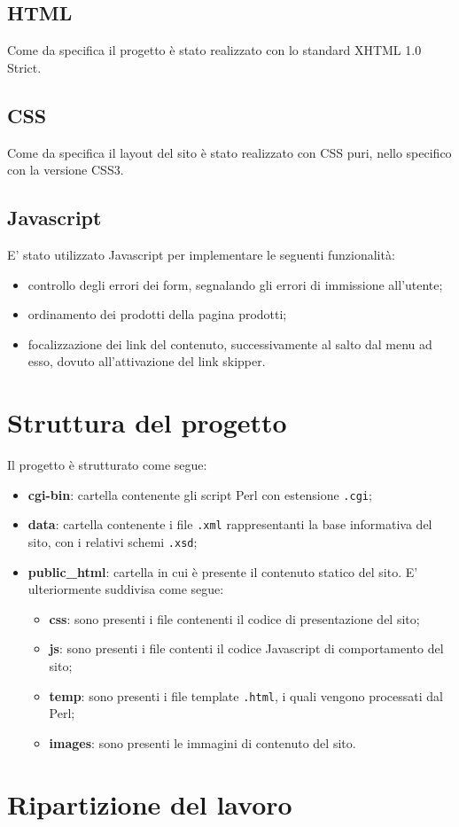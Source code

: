 	\subsection{HTML}
	Come da specifica il progetto è stato realizzato con lo standard XHTML 1.0 Strict.
	\subsection{CSS}
	Come da specifica il layout del sito è stato realizzato con CSS puri, nello specifico con la versione CSS3.
	\subsection{Javascript}
	E' stato utilizzato Javascript per implementare le seguenti funzionalità:
	\begin{itemize}
		\item controllo degli errori dei form, segnalando gli errori di immissione all'utente;
		\item ordinamento dei prodotti della pagina prodotti;
		\item focalizzazione dei link del contenuto, successivamente al salto dal menu ad esso, dovuto all'attivazione del link skipper.
	\end{itemize}
\section{Struttura del progetto}
	Il progetto è strutturato come segue:
	\begin{itemize}
		\item \textbf{cgi-bin}: cartella contenente gli script Perl con estensione \texttt{.cgi};
		\item \textbf{data}: cartella contenente i file \texttt{.xml} rappresentanti la base informativa del sito, con i relativi schemi \texttt{.xsd};
		\item \textbf{public\_html}: cartella in cui è presente il contenuto statico del sito. E' ulteriormente suddivisa come segue:
		\begin{itemize}
			\item \textbf{css}: sono presenti i file contenenti il codice di presentazione del sito;
			\item \textbf{js}: sono presenti i file contenti il codice Javascript di comportamento del sito;
			\item \textbf{temp}: sono presenti i file template \texttt{.html}, i quali vengono processati dal Perl;
			\item \textbf{images}: sono presenti le immagini di contenuto del sito.
		\end{itemize}
	\end{itemize}
\section{Ripartizione del lavoro}
